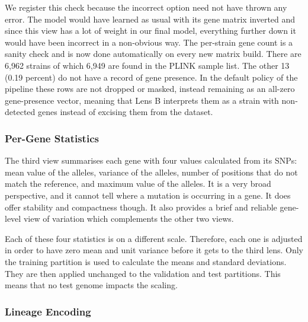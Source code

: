 \vspace{1em}

We register this check because the incorrect option need not have thrown any error. The model
would have learned as usual with its gene matrix inverted and since this view has a lot of
weight in our final model, everything further down it would have been incorrect in a
non-obvious way. The per-strain gene count is a sanity check and is now done automatically on
every new matrix build. There are 6,962 strains of which 6,949 are found in the PLINK sample
list. The other 13 (0.19 percent) do not have a record of gene presence. In the default policy
of the pipeline these rows are not dropped or masked, instead remaining as an all-zero
gene-presence vector, meaning that Lens B interprets them as a strain with non-detected genes
instead of excising them from the dataset.

\subsubsection{Per-Gene Statistics}

The third view summarises each gene with four values calculated from its SNPs: mean value of
the alleles, variance of the alleles, number of positions that do not match the reference, and
maximum value of the alleles. It is a very broad perspective, and it cannot tell where a
mutation is occurring in a gene. It does offer stability and compactness though. It also
provides a brief and reliable gene-level view of variation which complements the other two
views.

Each of these four statistics is on a different scale. Therefore, each one is adjusted in
order to have zero mean and unit variance before it gets to the third lens. Only the training
partition is used to calculate the means and standard deviations. They are then applied
unchanged to the validation and test partitions. This means that no test genome impacts the
scaling.

\subsubsection{Lineage Encoding}


